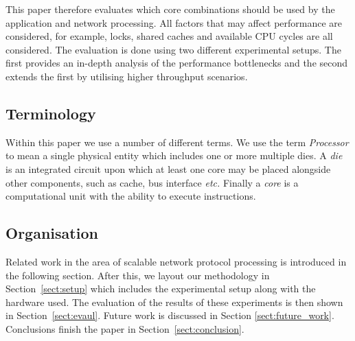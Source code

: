 \documentclass[conference, compsoc]{IEEEtran}
\begin{document}

This paper therefore evaluates which core combinations should be used by the application and network processing. All factors that may affect performance are considered, for example, locks, shared caches and available CPU cycles are all considered. The evaluation is done using two different experimental setups.  The first provides an in-depth analysis of the performance bottlenecks and the second extends the first by utilising higher throughput scenarios.


\subsection{Terminology}
Within this paper we use a number of different terms. We use the term \emph{Processor} to mean a single physical entity which includes one or more multiple dies. A \emph{die} is an integrated circuit upon which at least one core may be placed alongside other components, such as cache, bus interface \emph{etc.} Finally a \emph{core} is a computational unit with the ability to execute instructions.


\subsection{Organisation}
\label{sect:Over}
Related work in the area of scalable network protocol processing is introduced in the following section. After this, we layout our methodology in Section~\ref{sect:setup} which includes the experimental setup along with the hardware used. The evaluation of the results of these experiments is then shown in Section~\ref{sect:evaul}. Future work is discussed in Section \ref{sect:future_work}. Conclusions finish the paper in Section~\ref{sect:conclusion}.
\end{document}
